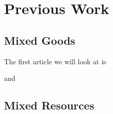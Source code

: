 \section{Previous Work}\label{sec:previous-work}







\subsection{Mixed Goods}\label{subsec:mixed-goods}

The first article we will look at is 


\cite{maximin} and \cite{mixed-goods} \cite{mixed-manna}


\subsection{Mixed Resources}\label{subsec:mixed-resources}

\cite{mixed-resources}